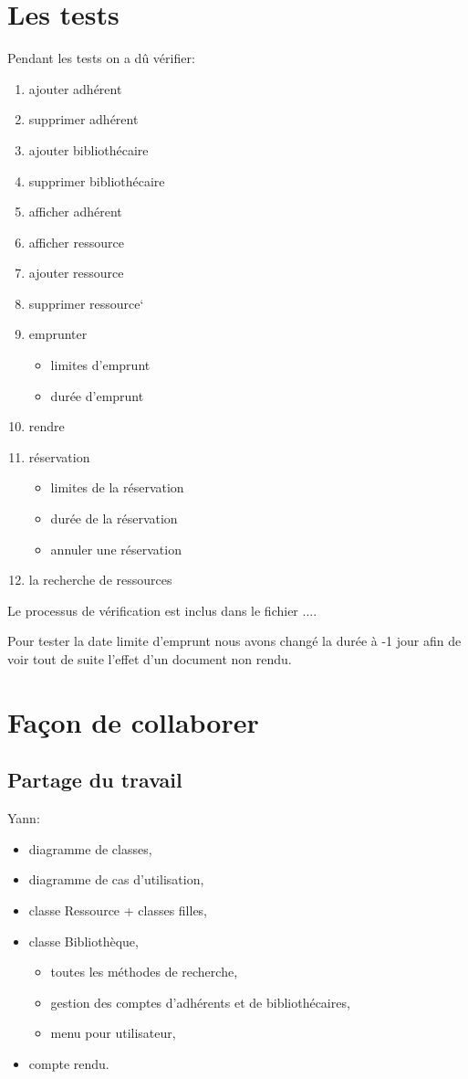 \documentclass[10pt, a4paper]{article}
\begin{document}
	\section{Les tests}
	Pendant les tests on a dû vérifier:
	\begin{enumerate}
		\item ajouter adhérent
		\item supprimer adhérent
		\item ajouter bibliothécaire
		\item supprimer bibliothécaire
		\item afficher adhérent
		\item afficher ressource
		\item ajouter ressource
		\item supprimer ressource`
		\item emprunter
		\begin{itemize}
			\item limites d'emprunt
			\item durée d'emprunt
		\end{itemize}
		\item rendre
		\item réservation
		\begin{itemize}
			\item limites de la réservation
			\item durée de  la réservation
			\item annuler une réservation
		\end{itemize}
		\item la recherche de ressources 
	\end{enumerate}
	
	
	Le processus de vérification est inclus dans le fichier ....
	
	Pour tester la date limite d'emprunt nous avons changé la durée à -1 jour afin de voir tout de suite l'effet d'un document non 
	rendu.
	
	\section{Façon de collaborer}
		\subsection{Partage du travail}
		Yann:
		\begin{itemize}
			\item diagramme de classes,
			\item diagramme de cas d'utilisation,
			\item classe Ressource + classes filles,
			\item classe Bibliothèque,
			\begin{itemize}
				\item toutes les méthodes de recherche,
				\item gestion des comptes d'adhérents et de bibliothécaires,
				\item menu pour utilisateur,
			\end{itemize}
			\item compte rendu.
			
		\end{itemize}
		
\end{document}
